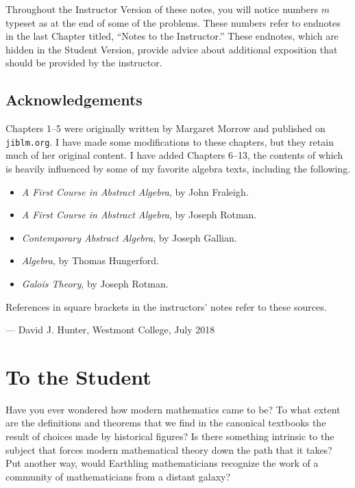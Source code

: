 \begin{annotation}
Throughout the Instructor Version of these notes, you will notice numbers $m$ typeset as  at the end of some of the problems. These numbers refer to endnotes in the last Chapter titled, ``Notes to the Instructor.'' These endnotes, which are hidden in the Student Version, provide advice about additional exposition that should be provided by the instructor.

\section*{Acknowledgements}

Chapters 1--5 were originally written by Margaret Morrow and published on \texttt{jiblm.org}. I have made some modifications to these chapters, but they retain much of her original content. I have added Chapters 6--13, the contents of which is heavily influenced by some of my favorite algebra texts, including the following.
\begin{itemize}
    \item \textit{A First Course in Abstract Algebra}, by John Fraleigh.
    \item \textit{A First Course in Abstract Algebra}, by Joseph Rotman.
    \item \textit{Contemporary Abstract Algebra}, by Joseph Gallian.
    \item \textit{Algebra}, by Thomas Hungerford.
    \item \textit{Galois Theory}, by Joseph Rotman.
\end{itemize}

References in square brackets in the instructors' notes refer to these sources.

\begin{flushright}
--- David J. Hunter, Westmont College, July 2018
\end{flushright}

\end{annotation}



\chapter{To the Student}

Have you ever wondered how modern mathematics came to be? To what extent are the definitions and theorems that we find in the canonical textbooks the result of choices made by historical figures? Is there something intrinsic to the subject that forces modern mathematical theory down the path that it takes? Put another way, would Earthling mathematicians recognize the work of a community of mathematicians from a distant galaxy?

